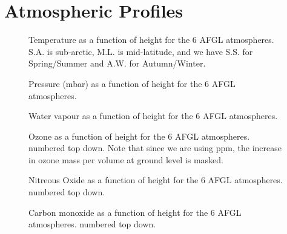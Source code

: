 \documentclass[12pt]{article}
\begin{document}
\section{Atmospheric Profiles}


\vspace*{10cm}
\begin{figure}[htb]
\caption{Temperature as a function of height for the 6 AFGL atmospheres.
S.A. is sub-arctic, M.L. is mid-latitude, and we have S.S. for Spring/Summer
and A.W. for Autumn/Winter.}
\end{figure}

\newpage
\vspace*{10cm}
\begin{figure}[htb]
\caption{Pressure (mbar) as a function of height for the 6 AFGL atmospheres.}
\end{figure}


\newpage
\vspace*{10cm}
\begin{figure}[htb]
\caption{Water vapour as a function of height for the 6 AFGL atmospheres.}
\end{figure}


\newpage
\vspace*{10cm}
\begin{figure}[htb]
\caption{Ozone as a function of height for the 6 AFGL atmospheres.
 numbered top down. Note that since we are using ppm, the increase in ozone mass per volume at ground level is masked.}
\end{figure}

\newpage
\vspace*{10cm}
\begin{figure}[htb]
\caption{Nitreous Oxide as a function of height for the 6 AFGL atmospheres.
 numbered top down.}
\end{figure}


\newpage
\vspace*{10cm}
\begin{figure}[htb]
\caption{Carbon monoxide as a function of height for the 6 AFGL atmospheres.
 numbered top down.}
\end{figure}
\end{document}
